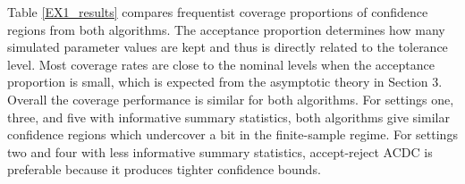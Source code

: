 Table \ref{EX1_results} compares frequentist coverage proportions of confidence regions from both algorithms. The acceptance proportion determines how many simulated parameter values are kept and thus is directly related to the tolerance level. Most coverage rates are close to the nominal levels when the acceptance proportion is small, which is expected from the asymptotic theory in Section 3. Overall the coverage performance is similar for both algorithms. For settings one, three, and five with informative summary statistics, both algorithms give similar confidence regions which undercover a bit in the finite-sample regime. For settings two and four with less informative summary statistics, accept-reject ACDC %
is preferable because it produces tighter confidence bounds. 

\begin{table}
\caption{{\it Coverage proportions of confidence sets from ACDC applied to Cauchy data under five different settings. Coverage is calculated over $500$ independent runs that draw a $n=400$ IID sample from a $Cauchy(\theta = 10, \tau = 0.55)$ distribution. The Monte Carlo sample size for both %
algorithms is $50,000$ and the nominal coverage level in every setting is $95\%$. The last column displays the median ratio of the sizes of confidence sets from accept-reject ACDC 
divided by those from IS-ABC. }} 
\end{table}
